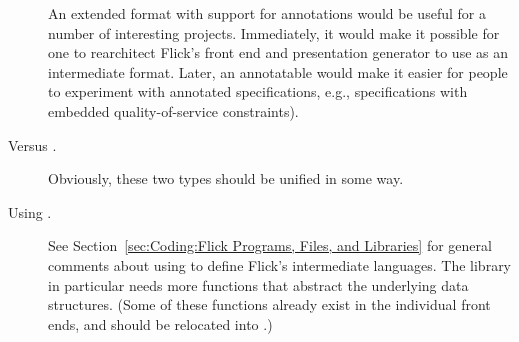 \begin{description}
  An extended \AOI{} format with support for annotations would be useful for a
  number of interesting projects.  Immediately, it would make it possible for
  one to rearchitect Flick's \MIG{} front end and presentation generator to use
  \AOI{} as an intermediate format.  Later, an annotatable \AOI{} would make it
  easier for people to experiment with annotated \IDL{} specifications, e.g.,
  specifications with embedded quality-of-service constraints).

  \item[\idl{AOI_INTEGER} Versus \idl{AOI_SCALAR}.]
  Obviously, these two types should be unified in some way.

  \item[Using \rpcgen{}.]
  See Section~\ref{sec:Coding:Flick Programs, Files, and Libraries} for general
  comments about using \ONCRPC{} \IDL{} to define Flick's intermediate
  languages.  The \AOI{} library in particular needs more functions that
  abstract the underlying \AOI{} data structures.  (Some of these functions
  already exist in the individual front ends, and should be relocated into
  .)
\end{description}



